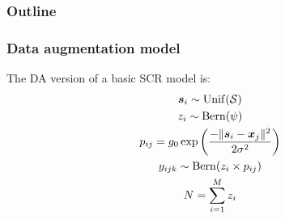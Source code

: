 \documentclass[color=usenames,dvipsnames]{beamer}\usepackage[]{graphicx}\usepackage[]{xcolor}
\begin{document}


\begin{frame}
  \frametitle{Outline}
  \Large
  \tableofcontents[currentsection]
\end{frame}





\begin{frame}
  \frametitle{Data augmentation model}
  The DA version of a basic SCR model is:
  \begin{gather*}
    {\bm s}_i \sim \mathrm{Unif}(\mathcal{S}) \\
    z_i \sim \mathrm{Bern}(\psi) \\
    p_{ij} = g_0\exp\left(\frac{-\|{\bm s}_i-{\bm x}_j\|^2}{2\sigma^2}\right) \\
    y_{ijk} \sim \mathrm{Bern}(z_i \times p_{ij}) \\
    N=\sum_{i=1}^M z_i
  \end{gather*}
\end{frame}
\end{document}

